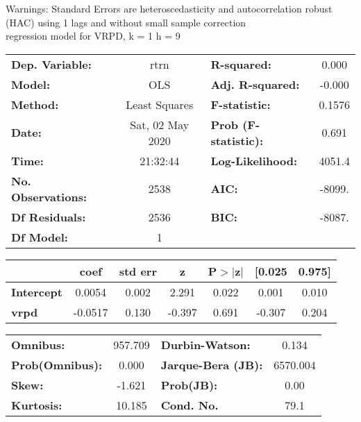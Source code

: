 Warnings: \newline
 [1] Standard Errors are heteroscedasticity and autocorrelation robust (HAC) using 1 lags and without small sample correction\\ 

regression model for VRPD, k = 1 h = 9\begin{center}
\begin{tabular}{lclc}
\toprule
\textbf{Dep. Variable:}    &       rtrn       & \textbf{  R-squared:         } &     0.000   \\
\textbf{Model:}            &       OLS        & \textbf{  Adj. R-squared:    } &    -0.000   \\
\textbf{Method:}           &  Least Squares   & \textbf{  F-statistic:       } &    0.1576   \\
\textbf{Date:}             & Sat, 02 May 2020 & \textbf{  Prob (F-statistic):} &    0.691    \\
\textbf{Time:}             &     21:32:44     & \textbf{  Log-Likelihood:    } &    4051.4   \\
\textbf{No. Observations:} &        2538      & \textbf{  AIC:               } &    -8099.   \\
\textbf{Df Residuals:}     &        2536      & \textbf{  BIC:               } &    -8087.   \\
\textbf{Df Model:}         &           1      & \textbf{                     } &             \\
\bottomrule
\end{tabular}
\begin{tabular}{lcccccc}
                   & \textbf{coef} & \textbf{std err} & \textbf{z} & \textbf{P$> |$z$|$} & \textbf{[0.025} & \textbf{0.975]}  \\
\midrule
\textbf{Intercept} &       0.0054  &        0.002     &     2.291  &         0.022        &        0.001    &        0.010     \\
\textbf{vrpd}      &      -0.0517  &        0.130     &    -0.397  &         0.691        &       -0.307    &        0.204     \\
\bottomrule
\end{tabular}
\begin{tabular}{lclc}
\textbf{Omnibus:}       & 957.709 & \textbf{  Durbin-Watson:     } &    0.134  \\
\textbf{Prob(Omnibus):} &   0.000 & \textbf{  Jarque-Bera (JB):  } & 6570.004  \\
\textbf{Skew:}          &  -1.621 & \textbf{  Prob(JB):          } &     0.00  \\
\textbf{Kurtosis:}      &  10.185 & \textbf{  Cond. No.          } &     79.1  \\
\bottomrule
\end{tabular}
\end{center}

